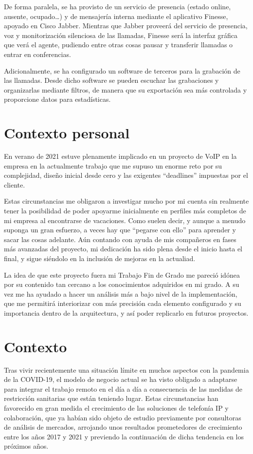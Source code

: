 \documentclass[a4paper, 12pt]{book}
\begin{document}
De forma paralela, se ha provisto de un servicio de presencia (estado online, ausente, ocupado\ldots) y de mensajería interna mediante el aplicativo Finesse, apoyado en Cisco Jabber.
Mientras que Jabber proveerá del servicio de presencia, voz y monitorización silenciosa de las llamadas, Finesse será la interfaz gráfica que verá el agente, pudiendo entre otras cosas pausar y transferir llamadas o entrar en conferencias.

Adicionalmente, se ha configurado un software de terceros para la grabación de las llamadas. Desde dicho software se pueden escuchar las grabaciones y organizarlas mediante filtros, de manera que su exportación sea más controlada y proporcione datos para estadísticas.



\section{Contexto personal}
En verano de 2021 estuve plenamente implicado en un proyecto de VoIP en la empresa en la actualmente trabajo que me supuso un enorme reto por su complejidad, diseño inicial desde cero y las exigentes ``deadlines'' impuestas por el cliente.

Estas circunstancias me obligaron a investigar mucho por mi cuenta sin realmente tener la posibilidad de poder apoyarme inicialmente en perfiles más completos de mi empresa al encontrarse de vacaciones.
Como suelen decir, y aunque a menudo suponga un gran esfuerzo, a veces hay que ``pegarse con ello'' para aprender y sacar las cosas adelante.
Aún contando con ayuda de mis compañeros en fases más avanzadas del proyecto, mi dedicación ha sido plena desde el inicio hasta el final, y sigue siéndolo en la inclusión de mejoras en la actualiad.

La idea de que este proyecto fuera mi Trabajo Fin de Grado me pareció idónea por su contenido tan cercano a los conocimientos adquiridos en mi grado. A su vez me ha ayudado a hacer un análisis más a bajo nivel de la implementación, que me permitirá interiorizar con más precisión cada elemento configurado y su importancia dentro de la arquitectura, y así poder replicarlo en futuros proyectos.

\section{Contexto}
Tras vivir recientemente una situación límite en muchos aspectos con la pandemia de la COVID-19, el modelo de negocio actual se ha visto obligado a adaptarse para integrar el trabajo remoto en el día a día a consecuencia de las medidas de restricción sanitarias que están teniendo lugar.
Estas circunstancias han favorecido en gran medida el crecimiento de las soluciones de telefonía IP y colaboración, que ya habían sido objeto de estudio previamente por consultoras de análisis de mercados, %
arrojando unos resultados prometedores de crecimiento entre los años 2017 y 2021 y previendo la continuación de dicha tendencia en los próximos años.
\end{document}
